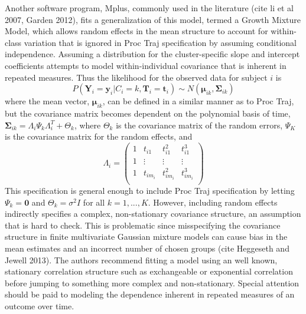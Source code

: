 \documentclass[11pt]{article}
\newcommand{\B}[0]{\mathbf}
\newcommand{\bs}[0]{\boldsymbol}
\begin{document}
Another software program, Mplus, commonly used in the literature (cite li et  al 2007, Garden 2012), fits a generalization of this model, termed a Growth Mixture Model, which allows random effects in the mean structure to account for within-class variation that is ignored in Proc Traj specification by assuming conditional independence. Assuming a distribution for the cluster-specific slope and intercept coefficients attempts to model within-individual covariance that is inherent in repeated measures. Thus the likelihood for the observed data for subject $i$ is
$$P(\B Y_{i} = \B y_{i}|C_{i}=k,\B T_{i}=\B t_{i})\sim N(\bs\mu_{ik},\bs\Sigma_{ik})$$
where the mean vector, $\bs\mu_{ik}$, can be defined in a similar manner as to Proc Traj, but the covariance matrix becomes dependent on the polynomial basis of time, $\bs\Sigma_{ik}=\Lambda_{i}\Psi_{k}\Lambda_{i}^{T}+\Theta_{k}$, where $\Theta_{k}$ is the covariance matrix of the random errors, $\Psi_{K}$ is the covariance matrix for the random effects, and $$\Lambda_{i}=\left(\begin{array}{cccc}1&t_{i1}&t_{i1}^{2}&t_{i1}^{3}\\ 1&\vdots&\vdots&\vdots\\ 1&t_{im_{i}}&t_{im_{i}}^{2}&t_{im_{i}}^{3}\\  \end{array} \right)$$
This specification is general enough to include Proc Traj specification by letting $\Psi_{k}=\B 0$ and $\Theta_{k}=\sigma^{2}I$ for all $k=1,...,K$. However, including random effects indirectly specifies a complex, non-stationary covariance structure, an assumption that is hard to check. This is problematic since misspecifying the covariance structure in finite multivariate Gaussian mixture models can cause bias in the mean estimates and an incorrect number of chosen groups (cite Heggeseth and Jewell 2013). The authors recommend fitting a model using an well known, stationary correlation structure such as exchangeable or exponential correlation before jumping to something more complex and non-stationary. Special attention should be paid to modeling the dependence inherent in repeated measures of an outcome over time.\\
\end{document}
